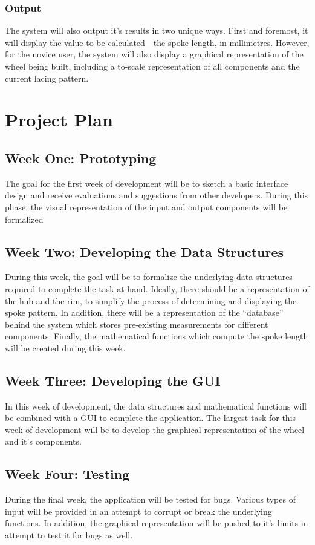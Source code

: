 \documentclass[11pt,a4paper]{article}
\begin{document}
      \subsubsection{Output}
      The system will also output it's results in two unique ways. First and foremost, it will display the value to be calculated---the spoke length, in millimetres. However, for the novice user, the system will also display a graphical representation of the wheel being built, including a to-scale representation of all components and the current lacing pattern.
  
  \section{Project Plan}
  
    \subsection{Week One: Prototyping}
    The goal for the first week of development will be to sketch a basic interface design and receive evaluations and suggestions from other developers. During this phase, the visual representation of the input and output components will be formalized
    
    \subsection{Week Two: Developing the Data Structures}
    During this week, the goal will be to formalize the underlying data structures required to complete the task at hand. Ideally, there should be a representation of the hub and the rim, to simplify the process of determining and displaying the spoke pattern. In addition, there will be a representation of the ``database'' behind the system which stores pre-existing measurements for different components. Finally, the mathematical functions which compute the spoke length will be created during this week.
    
    \subsection{Week Three: Developing the GUI}
    In this week of development, the data structures and mathematical functions will be combined with a GUI to complete the application. The largest task for this week of development will be to develop the graphical representation of the wheel and it's components.
    
    \subsection{Week Four: Testing}
	  During the final week, the application will be tested for bugs. Various types of input will be provided in an attempt to corrupt or break the underlying functions. In addition, the graphical representation will be pushed to it's limits in attempt to test it for bugs as well.
\end{document}
